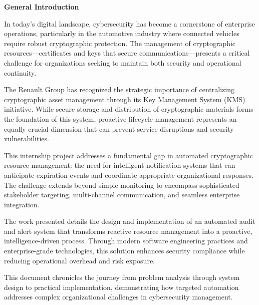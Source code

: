 \fancyhead{}  %

\vspace*{1cm}
\begin{center}
    \textbf{\huge{General Introduction}}
\end{center}
\vspace{1cm}

\begin{doublespace}
In today's digital landscape, cybersecurity has become a cornerstone of enterprise operations, particularly in the automotive industry where connected vehicles require robust cryptographic protection. The management of cryptographic resources—certificates and keys that secure communications—presents a critical challenge for organizations seeking to maintain both security and operational continuity.

The Renault Group has recognized the strategic importance of centralizing cryptographic asset management through its Key Management System (KMS) initiative. While secure storage and distribution of cryptographic materials forms the foundation of this system, proactive lifecycle management represents an equally crucial dimension that can prevent service disruptions and security vulnerabilities.

This internship project addresses a fundamental gap in automated cryptographic resource management: the need for intelligent notification systems that can anticipate expiration events and coordinate appropriate organizational responses. The challenge extends beyond simple monitoring to encompass sophisticated stakeholder targeting, multi-channel communication, and seamless enterprise integration.

The work presented details the design and implementation of an automated audit and alert system that transforms reactive resource management into a proactive, intelligence-driven process. Through modern software engineering practices and enterprise-grade technologies, this solution enhances security compliance while reducing operational overhead and risk exposure.

This document chronicles the journey from problem analysis through system design to practical implementation, demonstrating how targeted automation addresses complex organizational challenges in cybersecurity management.
\end{doublespace}